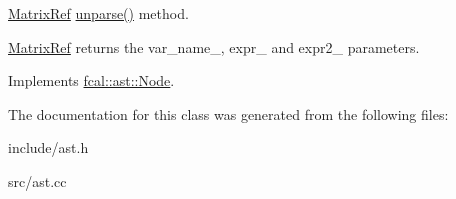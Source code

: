 \hyperlink{classfcal_1_1ast_1_1MatrixRef}{Matrix\+Ref} \hyperlink{classfcal_1_1ast_1_1MatrixRef_a464c4f47c039d24a14960d3d8df00051}{unparse()} method. 

\hyperlink{classfcal_1_1ast_1_1MatrixRef}{Matrix\+Ref} returns the var\+\_\+name\+\_\+, expr\+\_\+ and expr2\+\_\+ parameters. 

Implements \hyperlink{classfcal_1_1ast_1_1Node_a81865f5a1df593708a39bf492952742a}{fcal\+::ast\+::\+Node}.



The documentation for this class was generated from the following files\+:\begin{DoxyCompactItemize}
\item 
include/ast.\+h\item 
src/ast.\+cc\end{DoxyCompactItemize}
